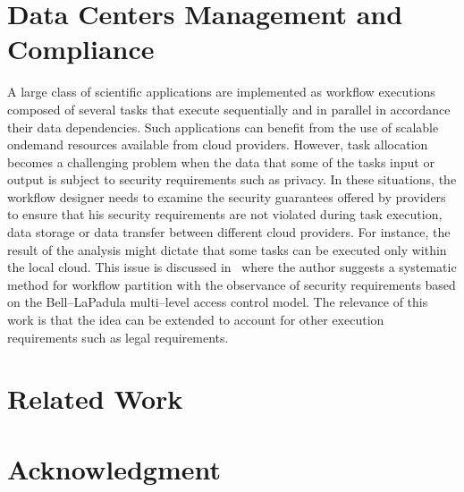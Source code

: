 \documentclass[runningheads,a4paper]{llncs}
\begin{document}
\section{Data Centers Management and Compliance}


A large class of scientific applications are implemented as
workflow executions composed of several tasks that execute
sequentially and in parallel in accordance their data
dependencies. Such applications can benefit from the use of 
scalable ondemand resources available from cloud providers. 
However, task allocation becomes a challenging problem when
the data that some of the tasks input or output is subject
to security requirements such as privacy.  In these situations, 
the workflow designer needs to examine the security guarantees offered
by providers to ensure that his security requirements are
not violated during task execution, data storage or data transfer between
different cloud providers. For instance,  the result of the
analysis might dictate that some tasks can be executed only
within the local cloud. This issue is discussed in~\cite{Watson2011}
where the author suggests a systematic method for workflow
partition with the observance of security requirements based 
on the Bell--LaPadula multi--level access control 
model. The relevance of this work is that the idea can be extended
to account for other execution requirements such as legal
requirements.

\section{Related Work}

\cite{Vaquero2011}

\cite{Millard2013}

\cite{Mitrakas2013}

\section*{Acknowledgment}




\end{document}
